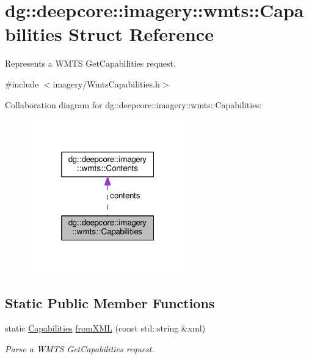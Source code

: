 \hypertarget{structdg_1_1deepcore_1_1imagery_1_1wmts_1_1_capabilities}{}\section{dg\+:\+:deepcore\+:\+:imagery\+:\+:wmts\+:\+:Capabilities Struct Reference}
\label{structdg_1_1deepcore_1_1imagery_1_1wmts_1_1_capabilities}


Represents a W\+M\+TS Get\+Capabilities request.  




{\ttfamily \#include $<$imagery/\+Wmts\+Capabilities.\+h$>$}



Collaboration diagram for dg\+:\+:deepcore\+:\+:imagery\+:\+:wmts\+:\+:Capabilities\+:
\nopagebreak
\begin{figure}[H]
\begin{center}
\leavevmode
\includegraphics[width=193pt]{structdg_1_1deepcore_1_1imagery_1_1wmts_1_1_capabilities__coll__graph}
\end{center}
\end{figure}
\subsection*{Static Public Member Functions}
\begin{DoxyCompactItemize}
\item 
static \hyperlink{structdg_1_1deepcore_1_1imagery_1_1wmts_1_1_capabilities}{Capabilities} \hyperlink{group___imagery_module_ga988934c965e1ad4eac2bdc22f8563349}{from\+X\+ML} (const std\+::string \&xml)
\begin{DoxyCompactList}\small\item\em Parse a W\+M\+TS Get\+Capabilities request. \end{DoxyCompactList}\end{DoxyCompactItemize}
